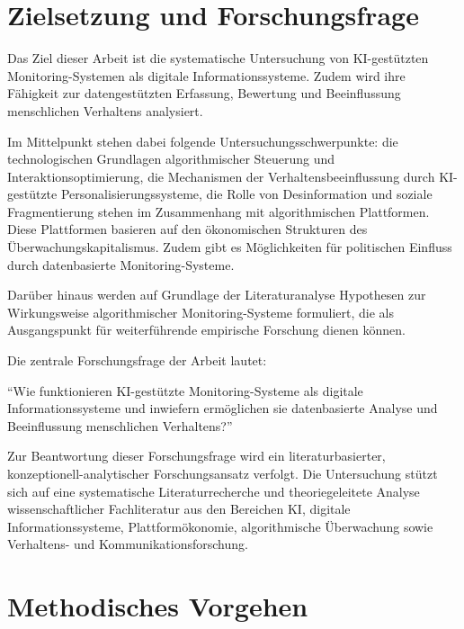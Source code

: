 \section{Zielsetzung und Forschungsfrage}

Das Ziel dieser Arbeit ist die systematische Untersuchung von \ac{KI}-gestützten Monitoring-Systemen als digitale Informationssysteme. Zudem wird ihre Fähigkeit zur datengestützten Erfassung, Bewertung und Beeinflussung menschlichen Verhaltens analysiert.

Im Mittelpunkt stehen dabei folgende Untersuchungsschwerpunkte: die technologischen Grundlagen algorithmischer Steuerung und Interaktionsoptimierung, die Mechanismen der Verhaltensbeeinflussung durch \ac{KI}-gestützte Personalisierungssysteme, die Rolle von Desinformation und soziale Fragmentierung stehen im Zusammenhang mit algorithmischen Plattformen. Diese Plattformen basieren auf den ökonomischen Strukturen des Überwachungskapitalismus. Zudem gibt es Möglichkeiten für politischen Einfluss durch datenbasierte Monitoring-Systeme.

Darüber hinaus werden auf Grundlage der Literaturanalyse Hypothesen zur Wirkungsweise algorithmischer Monitoring-Systeme formuliert, die als Ausgangspunkt für weiterführende empirische Forschung dienen können.

Die zentrale Forschungsfrage der Arbeit lautet:

\enquote{Wie funktionieren \ac{KI}-gestützte Monitoring-Systeme als digitale Informationssysteme und inwiefern ermöglichen sie datenbasierte Analyse und Beeinflussung menschlichen Verhaltens?}

Zur Beantwortung dieser Forschungsfrage wird ein literaturbasierter, konzeptionell-ana\-ly\-ti\-scher Forschungsansatz verfolgt. Die Untersuchung stützt sich auf eine systematische Literaturrecherche und theoriegeleitete Analyse wissenschaftlicher Fachliteratur aus den Bereichen \ac{KI}, digitale Informationssysteme, Plattformökonomie, algorithmische Überwachung sowie Verhaltens- und Kommunikationsforschung.


\section{Methodisches Vorgehen}

